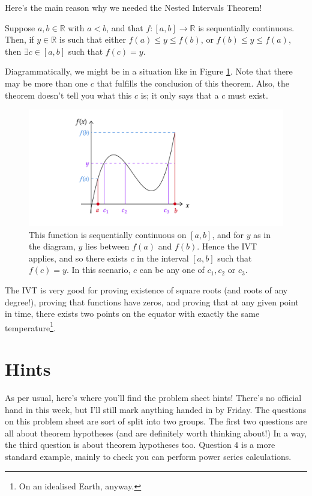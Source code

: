 \documentclass[
  12pt,
  a4paper]{extarticle}
\theoremstyle{plain}
\theoremstyle{plain}
\theoremstyle{plain}
\theoremstyle{plain}
\theoremstyle{plain}
\theoremstyle{definition}
\theoremstyle{definition}
\theoremstyle{definition}
\theoremstyle{remark}
\let\BeginKnitrBlock\begin \let\EndKnitrBlock\end
\renewcommand{\;}{\,}
\begin{document}
Here's the main reason why we needed the Nested Intervals Theorem!

\BeginKnitrBlock{theorem}[Intermediate Value Theorem (IVT)]
{\label{thm:thm2} }Suppose \(a,b \in \mathbb{R}\) with \(a < b\), and that \(f:[a,b] \to \mathbb{R}\) is sequentially continuous. Then, if \(y \in \mathbb{R}\) is such that either \(f(a) \leq y \leq f(b)\), or \(f(b) \leq y \leq f(a)\), then \(\exists c \in [a,b]\) such that \(f(c) = y\).
\EndKnitrBlock{theorem}
Diagrammatically, we might be in a situation like in Figure \ref{fig:ivt}. Note that there may be more than one \(c\) that fulfills the conclusion of this theorem. Also, the theorem doesn't tell you what this \(c\) is; it only says that a \(c\) must exist.

\begin{figure}
\includegraphics[width=\Width,height=\Height]{ivt} \caption{This function is sequentially continuous on $[a,b]$, and for $y$ as in the diagram, $y$ lies between $f(a)$ and $f(b)$. Hence the IVT applies, and so there exists $c$ in the interval $[a,b]$ such that $f(c)=y$. In this scenario, $c$ can be any one of $c_1,c_2$ or $c_3$.}\label{fig:ivt}
\end{figure}

The IVT is very good for proving existence of square roots (and roots of any degree!), proving that functions have zeros, and proving that at any given point in time, there exists two points on the equator with exactly the same temperature\footnote{On an idealised Earth, anyway.}.

\hypertarget{hints}{%
\section{Hints}\label{hints}}

As per usual, here's where you'll find the problem sheet hints! There's no official hand in this week, but I'll still mark anything handed in by Friday. The questions on this problem sheet are sort of split into two groups. The first two questions are all about theorem hypotheses (and are definitely worth thinking about!) In a way, the third question is about theorem hypotheses too. Question 4 is a more standard example, mainly to check you can perform power series calculations.
\end{document}

